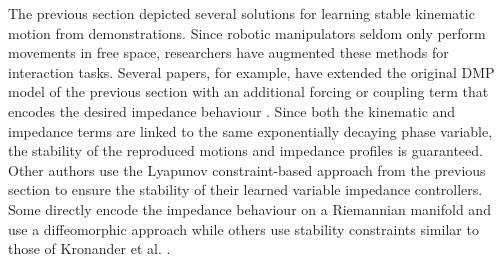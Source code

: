 
The previous section depicted several solutions for learning stable kinematic motion from demonstrations. Since robotic manipulators seldom only perform movements in free space, researchers have augmented these methods for interaction tasks. Several papers, for example, have extended the original DMP model of the previous section with an additional forcing or coupling term that encodes the desired impedance behaviour \cite{saverianoDynamicMovementPrimitives2021,dongDMPbasedOnlineAdaptive2021,hanModifiedDynamicMovement2022,hanModifiedDynamicMovement2022,liaoDynamicSkillLearning2022,yangDMPsbasedFrameworkRobot2018,yuHumanRobotVariableImpedance2022,zengRobotLearningHuman2018,zhangLearningGeneralizingVariable2022}. Since both the kinematic and impedance terms are linked to the same exponentially decaying phase variable, the stability of the reproduced motions and impedance profiles is guaranteed. Other authors use the Lyapunov constraint-based approach from the previous section to ensure the stability of their learned variable impedance controllers. Some directly encode the impedance behaviour on a Riemannian manifold and use a diffeomorphic approach \cite{saverianoLearningStableRobotic2022,wangLearningDeepRobotic2022} while others use
stability constraints similar to those of Kronander et al. \cite{kronanderStabilityConsiderationsVariable2016} \cite{tangTeachIndustrialRobots2016,jinOptimalVariableImpedance2022,douRobotSkillLearning2022,duanSequentialLearningUnification2019,arduengoGaussianProcessbasedRobotLearning2020}. 

